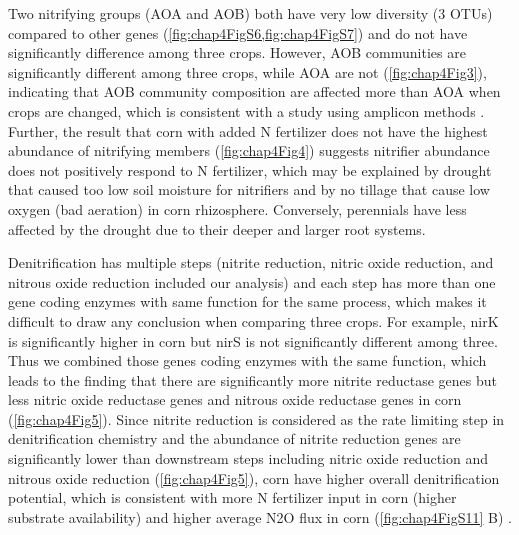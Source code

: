 \documentclass[]{msu-thesis}
\begin{document}
Two nitrifying groups (AOA and AOB) both have very low diversity (3 OTUs) compared to other genes (\cref{fig:chap4FigS6,fig:chap4FigS7}) and do not have significantly difference among three crops. However, AOB communities are significantly different among three crops, while AOA are not (\cref{fig:chap4Fig3}), indicating that AOB community composition are affected more than AOA when crops are changed, which is consistent with a study using amplicon methods \cite{shen_abundance_2008,wang_community_2009}. Further, the result that corn with added N fertilizer does not have the highest abundance of nitrifying members (\cref{fig:chap4Fig4}) suggests nitrifier abundance does not positively respond to N fertilizer, which may be explained by drought that caused too low soil moisture for nitrifiers \cite{di_effect_2014} and by no tillage that cause low oxygen (bad aeration) in corn rhizosphere. Conversely, perennials have less affected by the drought due to their deeper and larger root systems.

Denitrification has multiple steps (nitrite reduction, nitric oxide reduction, and nitrous oxide reduction included our analysis) and each step has more than one gene coding enzymes with same function for the same process, which makes it difficult to draw any conclusion when comparing three crops. For example, nirK is significantly higher in corn but nirS is not significantly different among three. Thus we combined those genes coding enzymes with the same function, which leads to the finding that there are significantly more nitrite reductase genes but less nitric oxide reductase genes and nitrous oxide reductase genes in corn (\cref{fig:chap4Fig5}). Since nitrite reduction is considered as the rate limiting step in denitrification chemistry \cite{zumft_cell_1997} and the abundance of nitrite reduction genes are significantly lower than downstream steps including nitric oxide reduction and nitrous oxide reduction (\cref{fig:chap4Fig5}), corn have higher overall denitrification potential, which is consistent with more N fertilizer input in corn (higher substrate availability) and higher average N2O flux in corn (\cref{fig:chap4FigS11} B) \cite{oates_nitrous_2015}.
\end{document}

